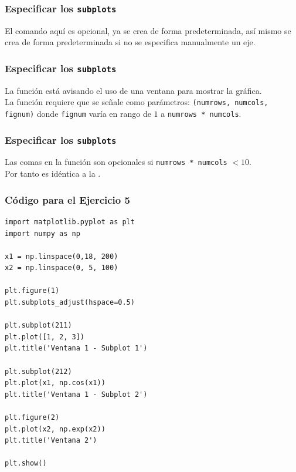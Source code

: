 \begin{frame}
\frametitle{Especificar los \texttt{subplots}}
El comando  aquí es opcional, ya  se crea de forma predeterminada, así mismo  se crea de forma predeterminada si no se especifica manualmente un eje.
\end{frame}
\begin{frame}
\frametitle{Especificar los \texttt{subplots}}
La función  está avisando el uso de una ventana para mostrar la gráfica.
\\
\bigskip
La función  requiere que se señale como parámetros: \texttt{(numrows, numcols, fignum)} donde \texttt{fignum} varía en rango de $1$ a \texttt{numrows * numcols}.
\end{frame}
\begin{frame}
\frametitle{Especificar los \texttt{subplots}}
Las comas en la función  son opcionales si \texttt{numrows * numcols} $<10$. 
\\
\bigskip
Por tanto  es idéntica a la .
\end{frame}
\begin{frame}
\frametitle{Código para el Ejercicio 5}
\begin{lstlisting}[style=codigopython]
import matplotlib.pyplot as plt
import numpy as np

x1 = np.linspace(0,18, 200)
x2 = np.linspace(0, 5, 100)

plt.figure(1)                
plt.subplots_adjust(hspace=0.5)

plt.subplot(211)        
plt.plot([1, 2, 3])
plt.title('Ventana 1 - Subplot 1')

plt.subplot(212)         
plt.plot(x1, np.cos(x1))
plt.title('Ventana 1 - Subplot 2')

plt.figure(2)                
plt.plot(x2, np.exp(x2))           
plt.title('Ventana 2')

plt.show()
\end{lstlisting}
\end{frame}
